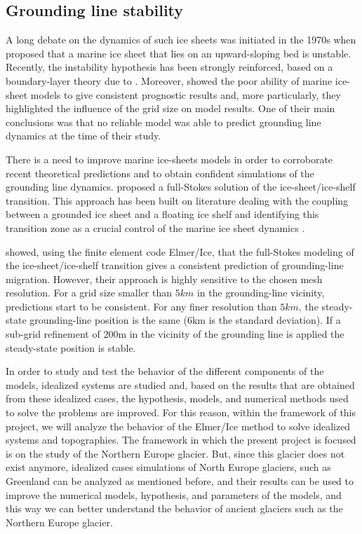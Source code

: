 \documentclass{article}
\begin{document}
\subsection{Grounding line stability}

A long debate on the dynamics of such ice sheets was initiated in the 1970s when \cite{weertman1974stability} proposed that a marine ice sheet that lies on an upward-sloping bed is unstable. Recently, the instability hypothesis has been strongly reinforced, based on a boundary-layer theory due to \cite{schoof2007ice}. Moreover, \cite{vieli2005assessing} showed the poor ability of marine ice-sheet models to give consistent prognostic results and, more particularly, they highlighted the influence of the grid size on model results. One of their main conclusions was that no reliable model was able to predict grounding line dynamics at the time of their study.

There is a need to improve marine ice-sheets models in order to corroborate recent theoretical predictions and to obtain confident simulations of the grounding line dynamics. \cite{durand2009marine} proposed a full-Stokes solution of the ice-sheet/ice-shelf transition. This approach has been built on literature dealing with the coupling between a grounded ice sheet and a floating ice shelf and identifying this transition zone as a crucial control of the marine ice sheet dynamics \cite[]{weertman1974stability, van1985response, chugunov1996modelling, hindmarsh1996stability, vieli2005assessing, schoof2007ice, schoof2007marine}.

\cite{durand2009full} showed, using the finite element code Elmer/Ice, that the full-Stokes modeling of the ice-sheet/ice-shelf transition gives a consistent prediction of grounding-line migration. However, their approach is highly sensitive to the chosen mesh resolution. For a grid size smaller than $5 km$ in the grounding-line vicinity, predictions start to be consistent. For any finer resolution than $5 km$, the steady-state grounding-line position is the same (6km is the standard deviation). If a sub-grid refinement of 200m in the vicinity of the grounding line is applied the steady-state position is stable.

In order to study and test the behavior of the different components of the models, idealized systems are studied and, based on the results that are obtained from these idealized cases, the hypothesis, models, and numerical methods used to solve the problems are improved. For this reason, within the framework of this project, we will analyze the behavior of the Elmer/Ice method to solve idealized systems and topographies. The framework in which the present project is focused is on the study of the Northern Europe glacier. But, since this glacier does not exist anymore, idealized cases simulations of North Europe glaciers, such as Greenland can be analyzed as mentioned before, and their results can be used to improve the numerical models, hypothesis, and parameters of the models, and this way we can better understand the behavior of ancient glaciers such as the Northern Europe glacier.
\end{document}
